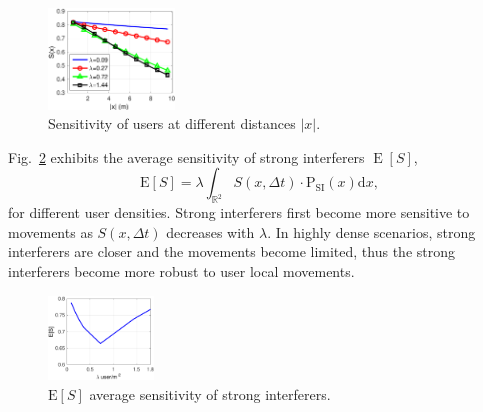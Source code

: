 \documentclass[10pt, conference, letterpaper]{IEEEtran}
\DeclareMathOperator*{\E}{\mathrm{E}}
\begin{document}
\begin{figure}
	\centering
	\includegraphics[width = 0.3\textwidth]{Channel_sensitivity.pdf}
	\caption{Sensitivity of users at different distances $|x|$.}
	\label{fig:Channel_sensitivity}
\end{figure}

Fig.~\ref{fig:Channel_sensitivity_average} exhibits the average sensitivity of strong interferers $\E[S]$,
\begin{equation*}
\mathrm{E}[S] = \lambda\int_{\mathbb{R}^2}S(x,\Delta t)\cdot \mathrm{P_{SI}}(x) \mathrm{d}x,
\end{equation*}
for different user densities.
Strong interferers first become more sensitive to movements as $S(x, \Delta t)$ decreases with $\lambda$. 
In highly dense scenarios, strong interferers are closer and the movements become limited, thus the strong interferers become more robust to user local movements.

\begin{figure}
	\centering
	\includegraphics[width = 0.25\textwidth]{Channel_sensitivity_average.pdf}
	\caption{$\mathrm{E}[S]$ average sensitivity of strong interferers.}
	\label{fig:Channel_sensitivity_average}
\end{figure}

\end{document}
